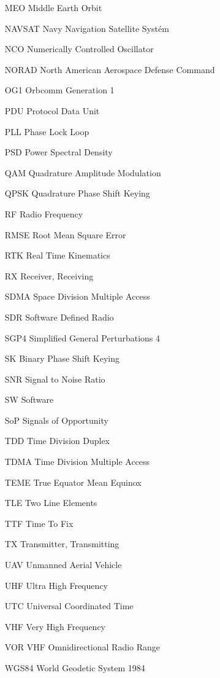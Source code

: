 \begin{itemize}
\item[MEO      ] Middle Earth Orbit                         
\item[NAVSAT   ] Navy Navigation Satellite Systém           
\item[NCO      ] Numerically Controlled Oscillator       
\item[NORAD    ] North American Aerospace Defense Command
\item[OG1      ] Orbcomm Generation 1                    
\item[PDU      ] Protocol Data Unit                      
\item[PLL      ] Phase Lock Loop                         
\item[PSD      ] Power Spectral Density                  
\item[QAM      ] Quadrature Amplitude Modulation            
\item[QPSK     ] Quadrature Phase Shift Keying           
\item[RF       ] Radio Frequency                         
\item[RMSE     ] Root Mean Square Error                  
\item[RTK      ] Real Time Kinematics                    
\item[RX       ] Receiver, Receiving                     
\item[SDMA     ] Space Division Multiple Access          
\item[SDR      ] Software Defined Radio                  
\item[SGP4     ] Simplified General Perturbations 4      
\item[SK       ] Binary Phase Shift Keying                  
\item[SNR      ] Signal to Noise Ratio                   
\item[SW       ] Software                                
\item[SoP      ] Signals of Opportunity                     
\item[TDD      ] Time Division Duplex                    
\item[TDMA     ] Time Division Multiple Access           
\item[TEME     ] True Equator Mean Equinox               
\item[TLE      ] Two Line Elements                       
\item[TTF      ] Time To Fix                             
\item[TX       ] Transmitter, Transmitting               
\item[UAV      ] Unmanned Aerial Vehicle                 
\item[UHF      ] Ultra High Frequency                    
\item[UTC      ] Universal Coordinated Time              
\item[VHF      ] Very High Frequency                     
\item[VOR      ] VHF Omnidirectional Radio Range         
\item[WGS84    ] World Geodetic System 1984                       
\end{itemize}
